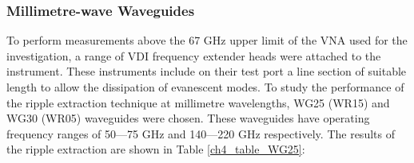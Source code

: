 \documentclass[../thesis/thesis.tex]{subfiles}
\begin{document}
\begin{refsection}
\subsubsection{Millimetre-wave Waveguides}

To perform measurements above the 67 GHz upper limit of the VNA used for the investigation, a range of VDI frequency extender heads were attached to the instrument. These instruments include on their test port a line section of suitable length to allow the dissipation of evanescent modes. To study the performance of the ripple extraction technique at millimetre wavelengths, WG25 (WR15) and WG30 (WR05) waveguides were chosen. These waveguides have operating frequency ranges of 50—75 GHz and 140—220 GHz respectively. The results of the ripple extraction are shown in Table \ref{ch4_table_WG25}:


\end{refsection}
\end{document}
